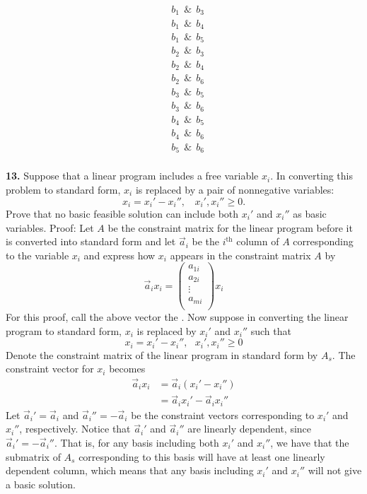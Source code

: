 \documentclass{article}
\begin{document}
\begin{itemize}
\begin{align*}
        &b_1 \:\: \& \:\: b_3 \\
        &b_1 \:\: \& \:\: b_4 \\
        &b_1 \:\: \& \:\: b_5 \\
        &b_2 \:\: \& \:\: b_3 \\
        &b_2 \:\: \& \:\: b_4 \\
        &b_2 \:\: \& \:\: b_6 \\
        &b_3 \:\: \& \:\: b_5 \\
        &b_3 \:\: \& \:\: b_6 \\
        &b_4 \:\: \& \:\: b_5 \\
        &b_4 \:\: \& \:\: b_6 \\
        &b_5 \:\: \& \:\: b_6 \\
    \end{align*}
\end{itemize}

\textbf{13.} Suppose that a linear program includes a free variable $x_i$. In converting this problem to standard form, $x_i$ is replaced by a pair of nonnegative variables:
\[x_i = x_i' - x_i'', \:\:\:\: x_i', x_i'' \geq 0.\]
Prove that no basic feasible solution can include both $x_i'$ and $x_i''$ as basic variables.
\newline\newline
Proof: Let $A$ be the constraint matrix for the linear program before it is converted into standard form and let $\vec{a}_i$ be the $i^{\text{th}}$ column of $A$ corresponding to the variable $x_i$ and express how $x_i$ appears in the constraint matrix $A$ by
\[\vec{a}_i x_i = \begin{pmatrix}
    a_{1i}\\
    a_{2i}\\
    \vdots\\
    a_{mi}\\
\end{pmatrix}x_i\]
For this proof, call the above vector the . Now suppose in converting the linear program to standard form, $x_i$ is replaced by $x_i'$ and $x_i''$ such that
\[x_i = x_i' - x_i'', \:\:\: x_i', x_i'' \geq 0\]
Denote the constraint matrix of the linear program in standard form by $A_s$. The constraint vector for $x_i$ becomes
\begin{align*}
    \vec{a}_ix_i &= \vec{a}_i(x_i' - x_i'') \\
    &= \vec{a}_ix_i' - \vec{a}_ix_i''
\end{align*}
Let $\vec{a}_i' = \vec{a}_i$ and $\vec{a}_i'' = -\vec{a}_i$ be the constraint vectors corresponding to $x_i'$ and $x_i''$, respectively. Notice that $\vec{a}_i'$ and $\vec{a}_i''$ are linearly dependent, since $\vec{a}_i' = -\vec{a}_i''$. That is, for any basis including both $x_i'$ and $x_i''$, we have that the submatrix of $A_s$ corresponding to this basis will have at least one linearly dependent column, which means that any basis including $x_i'$ and $x_i''$ will not give a basic solution.
\end{document}
